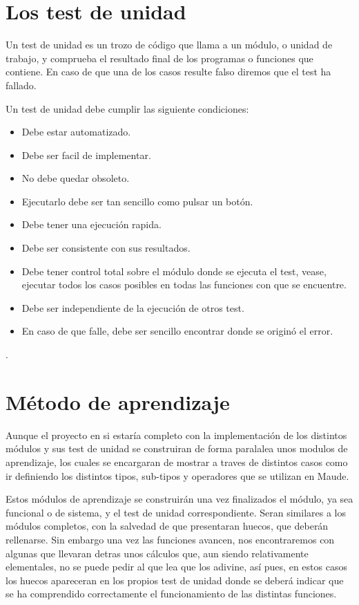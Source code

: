 \section{Los test de unidad}

Un test de unidad es un trozo de código que llama a un módulo, o unidad de trabajo, y comprueba el resultado final de los programas o funciones que contiene. En caso de que una de los casos resulte falso diremos que el test ha fallado.\par

Un test de unidad debe cumplir las siguiente condiciones: \par

\begin{itemize}
\item Debe estar automatizado.
\item Debe ser facil de implementar.
\item No debe quedar obsoleto.
\item Ejecutarlo debe ser tan sencillo como pulsar un botón.
\item Debe tener una ejecución rapida.
\item Debe ser consistente con sus resultados. 
\item Debe tener control total sobre el módulo donde se ejecuta el test, vease, ejecutar todos los casos posibles en todas las funciones con que se encuentre.
\item Debe ser independiente de la ejecución de otros test.
\item En caso de que falle, debe ser sencillo encontrar donde se originó el error.
\end{itemize}.

\cite{ref2}


\section{Método de aprendizaje}

Aunque el proyecto en si estaría completo con la implementación de los distintos módulos y sus test de unidad se construiran de forma paralalea unos modulos de aprendizaje, los cuales se encargaran de mostrar a traves de distintos casos como ir definiendo los distintos tipos, sub-tipos y operadores que se utilizan en Maude.\par

Estos módulos de aprendizaje se construirán una vez finalizados el módulo, ya sea funcional o de sistema, y el test de unidad correspondiente. Seran similares a los módulos completos, con la salvedad de que presentaran huecos, que deberán rellenarse. Sin embargo una vez las funciones avancen, nos encontraremos con algunas que llevaran detras unos cálculos que, aun siendo relativamente elementales, no se puede pedir al que lea que los adivine, así pues, en estos casos los huecos apareceran en los propios test de unidad donde se deberá indicar que se ha comprendido correctamente el funcionamiento de las distintas funciones. \par

